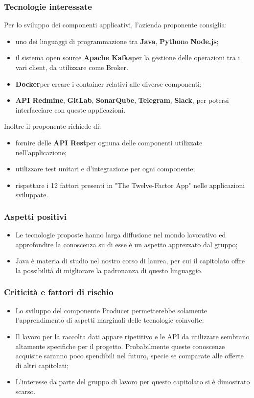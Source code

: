 \subsubsection{Tecnologie interessate}
Per lo sviluppo dei componenti applicativi, l'azienda proponente consiglia:
\begin{itemize}
	\item uno dei linguaggi di programmazione tra \textbf{Java},
	\textbf{Python}\glosp o \textbf{Node.js}\glo;
	\item il sistema open source \textbf{Apache Kafka}\glosp per la gestione delle
	operazioni tra i vari client, da utilizzare come Broker.
	\item \textbf{Docker}\glosp per creare i container relativi alle diverse componenti;
	\item \textbf{API Redmine}\glo,  \textbf{GitLab}\glo,  \textbf{SonarQube}\glo,  \textbf{Telegram}\glo, \textbf{Slack}\glo, per potersi interfacciare con queste applicazioni.
\end{itemize}
Inoltre il proponente richiede di:
\begin{itemize}
	\item fornire delle \textbf{API Rest}\glosp per ognuna delle componenti utilizzate nell'applicazione; 
	\item utilizzare test unitari e d'integrazione per ogni componente; 
	\item rispettare i 12 fattori presenti in "The Twelve-Factor App" nelle applicazioni sviluppate.
\end{itemize}
\subsubsection{Aspetti positivi}

\begin{itemize}
	\item Le tecnologie proposte hanno larga diffusione nel mondo lavorativo ed
	 approfondire la conoscenza su di esse è un aspetto apprezzato dal gruppo;
	\item Java è materia di studio nel nostro corso di laurea, per cui il
	 capitolato offre la possibilità di migliorare la padronanza di questo
	 linguaggio.
\end{itemize}
\subsubsection{Criticità e fattori di rischio}

\begin{itemize}
	\item Lo sviluppo del componente Producer permetterebbe solamente l'apprendimento di aspetti marginali delle tecnologie coinvolte.
	\item Il lavoro per la raccolta dati appare ripetitivo 
	 e le API da utilizzare sembrano altamente specifiche per il progetto. Probabilmente queste conoscenze acquisite saranno poco spendibili nel futuro, specie se comparate alle offerte di altri capitolati;
	\item L'interesse da parte del gruppo di lavoro per questo capitolato si è dimostrato scarso.
\end{itemize}

